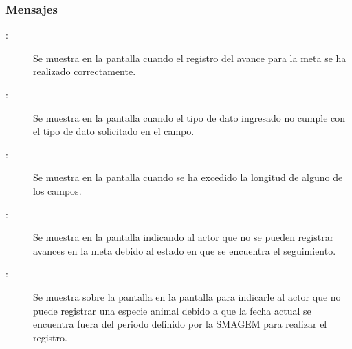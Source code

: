 \subsubsection{Mensajes}

    \begin{description}
    
        \item [:] Se muestra en la pantalla  cuando el registro del avance para la meta se ha realizado correctamente.
        
        \item [:] Se muestra en la pantalla  cuando el tipo de dato ingresado no cumple con el tipo de dato solicitado en el campo.
        
        \item [:] Se muestra en la pantalla  cuando se ha excedido la longitud de alguno de los campos.  
        
        \item [:] Se muestra en la pantalla  indicando al actor que no se pueden registrar avances en la meta debido al estado en que se encuentra el seguimiento.

        \item [:] Se muestra sobre la pantalla en la pantalla  para indicarle al actor que no puede registrar una especie animal debido a que la fecha actual se encuentra fuera del periodo definido por la SMAGEM para realizar el registro.
    \end{description}
